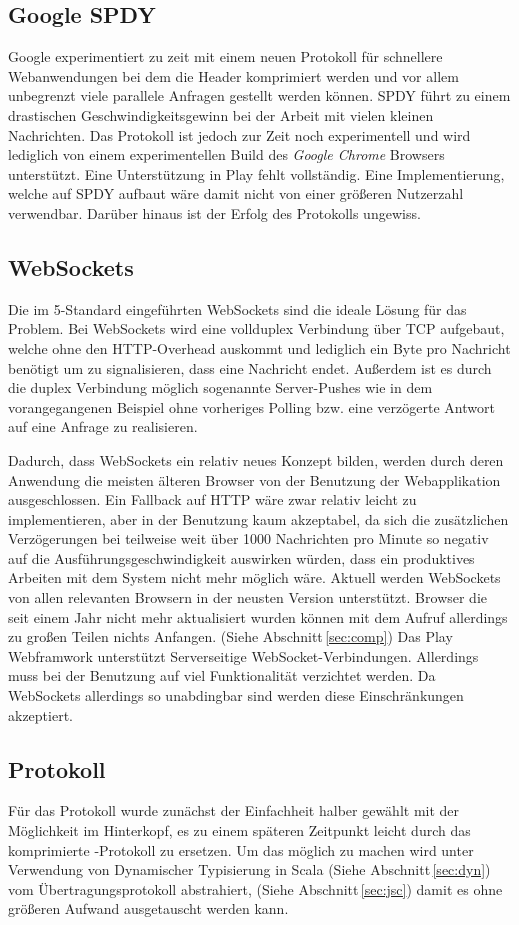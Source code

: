 \subsection{Google SPDY}

Google experimentiert zu zeit mit einem neuen Protokoll für schnellere Webanwendungen bei dem die
Header komprimiert werden und vor allem unbegrenzt viele parallele Anfragen gestellt werden können.
SPDY führt zu einem drastischen Geschwindigkeitsgewinn bei der Arbeit mit vielen kleinen
Nachrichten. Das Protokoll ist jedoch zur Zeit noch experimentell und wird lediglich von einem
experimentellen Build des \textit{Google Chrome} Browsers unterstützt. Eine Unterstützung in Play
fehlt vollständig. Eine Implementierung, welche auf SPDY aufbaut wäre damit nicht von einer größeren
Nutzerzahl verwendbar. Darüber hinaus ist der Erfolg des Protokolls ungewiss.

\subsection{WebSockets}
\label{sec:ws}

Die im 5-Standard eingeführten WebSockets sind die ideale Lösung für das Problem. Bei
WebSockets wird eine vollduplex Verbindung über TCP aufgebaut, welche ohne den HTTP-Overhead
auskommt und lediglich ein Byte pro Nachricht benötigt um zu signalisieren, dass eine Nachricht
endet. Außerdem ist es durch die duplex Verbindung möglich sogenannte Server-Pushes wie in dem
vorangegangenen Beispiel ohne vorheriges Polling bzw. eine verzögerte Antwort auf eine Anfrage zu
realisieren.

Dadurch, dass WebSockets ein relativ neues Konzept bilden, werden durch deren Anwendung die meisten
älteren Browser von der Benutzung der Webapplikation ausgeschlossen. Ein Fallback auf HTTP wäre zwar
relativ leicht zu implementieren, aber in der Benutzung kaum akzeptabel, da sich die zusätzlichen
Verzögerungen bei teilweise weit über 1000 Nachrichten pro Minute so negativ auf die
Ausführungsgeschwindigkeit auswirken würden, dass ein produktives Arbeiten mit dem System nicht mehr
möglich wäre. Aktuell werden WebSockets von allen relevanten Browsern in der neusten Version
unterstützt. Browser die seit einem Jahr nicht mehr aktualisiert wurden können mit dem Aufruf
allerdings zu großen Teilen nichts Anfangen. (Siehe Abschnitt\,\ref{sec:comp}) Das Play Webframwork
unterstützt Serverseitige WebSocket-Verbindungen. Allerdings muss bei der Benutzung auf viel
Funktionalität verzichtet werden. Da WebSockets allerdings so unabdingbar sind werden diese
Einschränkungen akzeptiert.

\subsection{Protokoll}

Für das Protokoll wurde zunächst der Einfachheit halber  gewählt mit der Möglichkeit im
Hinterkopf, es zu einem späteren Zeitpunkt leicht durch das komprimierte -Protokoll zu
ersetzen. Um das möglich zu machen wird unter Verwendung von Dynamischer Typisierung in Scala (Siehe
Abschnitt\,\ref{sec:dyn}) vom Übertragungsprotokoll abstrahiert, (Siehe Abschnitt\,\ref{sec:jsc})
damit es ohne größeren Aufwand ausgetauscht werden kann.
